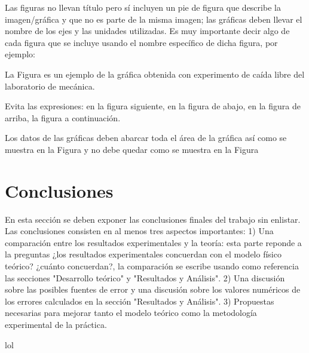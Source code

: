 \documentclass{article}
\begin{document}
\begin{multicols}{2}
Las figuras no llevan título pero sí incluyen un pie de figura que describe la imagen/gráfica y que no es parte de la misma imagen; las gr\'aficas deben llevar el nombre de los ejes y las unidades utilizadas. Es muy importante decir algo de cada figura que se incluye usando el nombre específico de dicha figura, por ejemplo: 

La Figura es un ejemplo de la gráfica obtenida con experimento de caída libre del laboratorio de mecánica. 

Evita las expresiones: en la figura siguiente, en la figura de abajo, en la figura de arriba, la figura a continuación. 

Los datos de las gráficas deben abarcar toda el área de la gráfica así como se muestra en la Figura y no debe quedar como se muestra en la Figura 





\section*{Conclusiones}\label{Conclusiones}				%

En esta sección se deben exponer las conclusiones finales del trabajo sin enlistar. Las conclusiones consisten en al menos tres aspectos importantes: 1) Una comparación entre los resultados experimentales y la teoría: esta parte reponde a la preguntas ¿los resultados experimentales concuerdan con el modelo físico teórico? ¿cuánto concuerdan?, la comparación se escribe usando como referencia las secciones "Desarrollo teórico" y "Resultados y Análisis". 2) Una discusión sobre las posibles fuentes de error y una discusión sobre los valores numéricos de los errores calculados en la sección "Resultados y Análisis". 3) Propuestas necesarias para mejorar tanto el modelo teórico como la metodología experimental de la práctica.

\begin{thebibliography}{9}						%

%
\end{thebibliography}
lol


\end{multicols}
\end{document}
